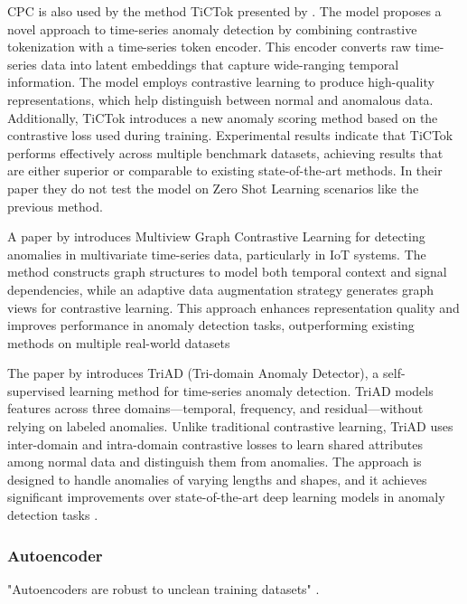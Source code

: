 CPC is also used by the method TiCTok presented by \cite{kang_tictok_2023}. The model proposes a novel approach to time-series anomaly detection by combining contrastive tokenization with a time-series token encoder. This encoder converts raw time-series data into latent embeddings that capture wide-ranging temporal information. The model employs contrastive learning to produce high-quality representations, which help distinguish between normal and anomalous data. Additionally, TiCTok introduces a new anomaly scoring method based on the contrastive loss used during training. Experimental results indicate that TiCTok performs effectively across multiple benchmark datasets, achieving results that are either superior or comparable to existing state-of-the-art methods. In their paper they do not test the model on Zero Shot Learning scenarios like the previous method.

A paper by \cite{qin_multiview_2023} introduces Multiview Graph Contrastive Learning for detecting anomalies in multivariate time-series data, particularly in IoT systems. The method constructs graph structures to model both temporal context and signal dependencies, while an adaptive data augmentation strategy generates graph views for contrastive learning. This approach enhances representation quality and improves performance in anomaly detection tasks, outperforming existing methods on multiple real-world datasets

The paper by \cite{sun_unraveling_2023} introduces TriAD (Tri-domain Anomaly Detector), a self-supervised learning method for time-series anomaly detection. TriAD models features across three domains—temporal, frequency, and residual—without relying on labeled anomalies. Unlike traditional contrastive learning, TriAD uses inter-domain and intra-domain contrastive losses to learn shared attributes among normal data and distinguish them from anomalies. The approach is designed to handle anomalies of varying lengths and shapes, and it achieves significant improvements over state-of-the-art deep learning models in anomaly detection tasks \cite{sun_unraveling_2023}.



\subsubsection{Autoencoder}
"Autoencoders are robust to unclean training datasets" \cite[p. 2487]{abdulaal_practical_2021}.

